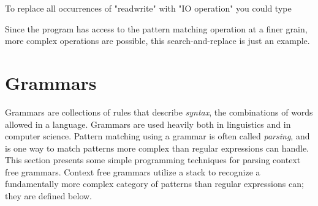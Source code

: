 
To replace all occurrences of
"read{\textbar}write" with
"IO operation" you could type 


Since the program has access to the pattern matching operation at a
finer grain, more complex operations are possible, this
search-and-replace is just an example.

\section{Grammars}

Grammars are collections of rules that describe
\textit{syntax}, the combinations of words allowed in a
language. Grammars are used heavily both in linguistics and in computer
science. Pattern matching using a grammar is
often called \textit{parsing}, and is one way to match
patterns more complex than regular expressions can handle. This section
presents some simple programming techniques for parsing context free
grammars. Context free grammars utilize a stack to
recognize a fundamentally more complex category of patterns than
regular expressions can; they are defined below.

